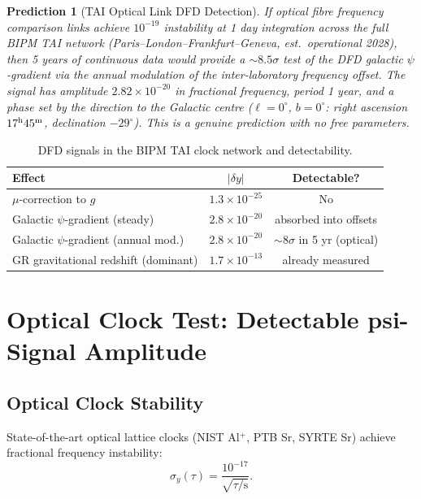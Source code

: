 \documentclass[aps,prd,twocolumn,superscriptaddress,nofootinbib]{revtex4-2}
\newtheorem{prediction}{Prediction}
\begin{document}
\begin{prediction}[TAI Optical Link DFD Detection]
\label{pred:tai}
If optical fibre frequency comparison links achieve $10^{-19}$ instability
at 1 day integration across the full BIPM TAI network
(Paris--London--Frankfurt--Geneva, est.\ operational 2028),
then 5 years of continuous data would provide a $\sim 8.5\sigma$ test
of the DFD galactic $\psi$-gradient via the annual modulation
of the inter-laboratory frequency offset. The signal has amplitude
$2.82\times10^{-20}$ in fractional frequency, period 1 year, and
a phase set by the direction to the Galactic centre
($\ell = 0^\circ$, $b = 0^\circ$: right ascension $17^{\rm h}45^{\rm m}$,
declination $-29^\circ$). This is a \emph{genuine prediction} with
no free parameters.
\end{prediction}

\begin{table}[h]
\caption{DFD signals in the BIPM TAI clock network and detectability.}
\label{tab:tai_signals}
\begin{ruledtabular}
\begin{tabular}{lcc}
Effect & $|\delta y|$ & Detectable? \\
\hline
$\mu$-correction to $g$ & $1.3\times10^{-25}$ & No \\
Galactic $\psi$-gradient (steady) & $2.8\times10^{-20}$ & absorbed into offsets \\
Galactic $\psi$-gradient (annual mod.) & $2.8\times10^{-20}$ & $\sim 8\sigma$ in 5 yr (optical)\\
GR gravitational redshift (dominant) & $1.7\times10^{-13}$ & already measured \\
\end{tabular}
\end{ruledtabular}
\end{table}

\section{Optical Clock Test: Detectable psi-Signal Amplitude}

\subsection{Optical Clock Stability}

State-of-the-art optical lattice clocks (NIST Al$^+$, PTB Sr, SYRTE Sr)
achieve fractional frequency instability:
\begin{equation}
\sigma_y(\tau) = \frac{10^{-17}}{\sqrt{\tau/\text{s}}}.
\label{eq:optical_stability}
\end{equation}
\end{document}
